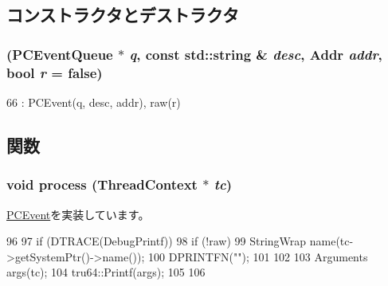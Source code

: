 \subsection{コンストラクタとデストラクタ}
\hypertarget{classDebugPrintfEvent_aa5a5cb2101117463899ff7d14a256455}{
\subsubsection[{DebugPrintfEvent}]{ ({\bf PCEventQueue} $\ast$ {\em q}, \/  const std::string \& {\em desc}, \/  {\bf Addr} {\em addr}, \/  bool {\em r} = {\ttfamily false})}}
\label{classDebugPrintfEvent_aa5a5cb2101117463899ff7d14a256455}



\begin{DoxyCode}
66         : PCEvent(q, desc, addr), raw(r) {}
\end{DoxyCode}


\subsection{関数}
\hypertarget{classDebugPrintfEvent_ad66a9d5ec7cfe597b848a17c0df5cc28}{
\subsubsection[{process}]{\setlength{\rightskip}{0pt plus 5cm}void process ({\bf ThreadContext} $\ast$ {\em tc})}}
\label{classDebugPrintfEvent_ad66a9d5ec7cfe597b848a17c0df5cc28}


\hyperlink{classPCEvent_af6ff225900b7b98c08880da7225b38f0}{PCEvent}を実装しています。


\begin{DoxyCode}
96 {
97     if (DTRACE(DebugPrintf)) {
98         if (!raw) {
99             StringWrap name(tc->getSystemPtr()->name());
100             DPRINTFN("");
101         }
102 
103         Arguments args(tc);
104         tru64::Printf(args);
105     }
106 }
\end{DoxyCode}



